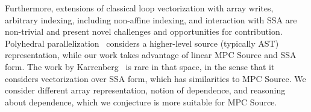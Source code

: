 Furthermore, extensions of classical loop vectorization with array writes, arbitrary indexing, including non-affine indexing, and interaction with SSA are non-trivial
and present novel challenges and opportunities for contribution. Polyhedral parallelization~\cite{Benabderrahmane:2010} considers a higher-level source (typically AST)
representation, while our work takes advantage of linear MPC Source and SSA form. The work by Karrenberg~\cite{Karrenberg:2015} is rare in that space, in the sense that it considers
vectorization over SSA form, which has similarities to MPC Source. We consider different array representation, notion of dependence, and reasoning
about dependence, which we conjecture is more suitable for MPC Source. 
